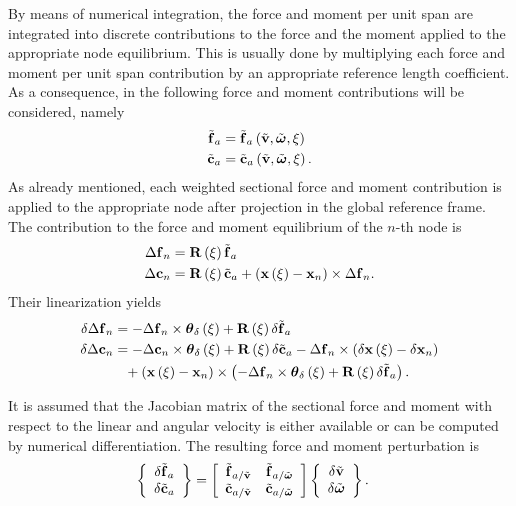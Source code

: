 By means of numerical integration, the force and moment per unit span
are integrated into discrete contributions to the force and the moment
applied to the appropriate node equilibrium.
This is usually done by multiplying each force and moment per unit span
contribution by an appropriate reference length coefficient.
As a consequence, in the following force and moment contributions
will be considered, namely
\begin{subequations}
\begin{align}
	\tilde{\bm{\mathbf{f}}}_a
	&=
	\tilde{\bm{\mathbf{f}}}_a\left( \tilde{\bm{\mathbf{v}}}, \tilde{\bm{\mathbf{\omega}}}, \xi \right)
	\\
	\tilde{\bm{\mathbf{c}}}_a
	&=
	\tilde{\bm{\mathbf{c}}}_a\left( \tilde{\bm{\mathbf{v}}}, \tilde{\bm{\mathbf{\omega}}}, \xi \right)
	.
\end{align}
\end{subequations}
As already mentioned, each weighted sectional force and moment contribution
is applied to the appropriate node after projection in the global reference
frame.
The contribution to the force and moment equilibrium of the $n$-th node is
\begin{subequations}
	\label{eq:aero:fm-contrib}
\begin{align}
	\Delta\T{f}_n
	&=
	\TT{R}\plbr{\xi} \tilde{\T{f}}_a
	\label{eq:aero:fm-contrib:f}
	\\
	\Delta\T{c}_n
	&=
	\TT{R}\plbr{\xi} \tilde{\T{c}}_a
	+ \plbr{\T{x}\plbr{\xi} - \T{x}_n} \times \Delta\T{f}_n
	\label{eq:aero:fm-contrib:m}
	.
\end{align}
\end{subequations}
Their linearization yields
\begin{subequations}
\begin{align}
	\delta\Delta\bm{\mathbf{f}}_n
	&=
	- \Delta\bm{\mathbf{f}}_n \times \bm{\mathbf{\theta}}_{\delta}\left( \xi \right)
	+ \bm{\mathbf{R}}\left( \xi \right) \delta\tilde{\bm{\mathbf{f}}}_a
	\\
	\delta\Delta\bm{\mathbf{c}}_n
	&=
	- \Delta\bm{\mathbf{c}}_n \times \bm{\mathbf{\theta}}_{\delta}\left( \xi \right)
	+ \bm{\mathbf{R}}\left( \xi \right) \delta\tilde{\bm{\mathbf{c}}}_a
	- \Delta\bm{\mathbf{f}}_n \times \left( 
		\delta\bm{\mathbf{x}}\left( \xi \right)
		- \delta\bm{\mathbf{x}}_n
	 \right)
	\nonumber \\
	&\hphantom{= } \mbox{}
	+ \left( 
		\bm{\mathbf{x}}\left( \xi \right)
		- \bm{\mathbf{x}}_n
	 \right) \times \left( 
		- \Delta\bm{\mathbf{f}}_n \times \bm{\mathbf{\theta}}_{\delta}\left( \xi \right)
		+ \bm{\mathbf{R}}\left( \xi \right) \delta\tilde{\bm{\mathbf{f}}}_a
	 \right)
	.
\end{align}
\end{subequations}

It is assumed that the Jacobian matrix of the sectional force and moment
with respect to the linear and angular velocity
is either available or can be computed by numerical differentiation.
The resulting force and moment perturbation is
\begin{align}
	\cubr{\cvvect{
		\delta\tilde{\T{f}}_a \\
		\delta\tilde{\T{c}}_a
	}} &= \sqbr{\matr{cc}{
		\tilde{\T{f}}_{a/\tilde{\T{v}}} & \tilde{\T{f}}_{a/\tilde{\T{\omega}}} \\
		\tilde{\T{c}}_{a/\tilde{\T{v}}} & \tilde{\T{c}}_{a/\tilde{\T{\omega}}}
	}} \cubr{\cvvect{
		\delta\tilde{\T{v}} \\
		\delta\tilde{\T{\omega}}
	}}
	\label{eq:aero:jac}
	.
\end{align}

